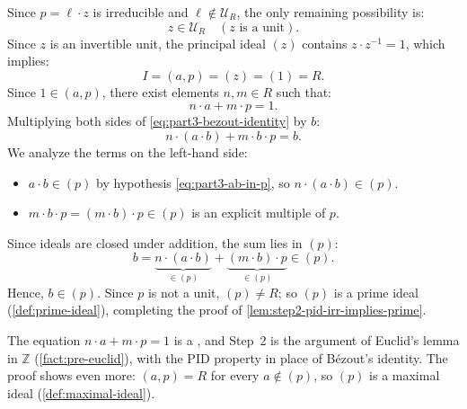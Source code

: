 \begin{proofWrapper}
\begin{content}
Since $p = \ell \cdot z$ is irreducible and $\ell \notin \mathcal{U}_R$, the only remaining possibility is:
\begin{equation}\label{eq:part3-z-is-unit}
z \in \mathcal{U}_R \quad (z \text{ is a unit}).
\end{equation}
Since $z$ is an invertible unit, the principal ideal $(z)$ contains $z \cdot z^{-1} = 1$, which implies:
\begin{equation}\label{eq:part3-ideal-unit}
I = (a, p) = (z) = (1) = R.
\end{equation}
Since $1 \in (a, p)$, there exist elements $n, m \in R$ such that:
\begin{equation}\label{eq:part3-bezout-identity}
n \cdot a + m \cdot p = 1.
\end{equation}
Multiplying both sides of \eqref{eq:part3-bezout-identity} by $b$:
\begin{equation}\label{eq:part3-multiply-b}
n \cdot (a \cdot b) + m \cdot b \cdot p = b.
\end{equation}
We analyze the terms on the left-hand side:
\begin{itemize}
    \item $a \cdot b \in (p)$ by hypothesis \eqref{eq:part3-ab-in-p}, so $n \cdot (a \cdot b) \in (p)$.
    \item $m \cdot b \cdot p = (m \cdot b) \cdot p \in (p)$ is an explicit multiple of $p$.
\end{itemize}
Since ideals are closed under addition, the sum lies in $(p)$:
\begin{equation}\label{eq:part3-b-in-p-final}
b = \underbrace{n \cdot (a \cdot b)}_{\in (p)} + \underbrace{(m \cdot b) \cdot p}_{\in (p)} \in (p).
\end{equation}
Hence, $b \in (p)$. Since $p$ is not a unit, $(p) \neq R$; so $(p)$ is a prime ideal (\cref{def:prime-ideal}), completing the proof of \cref{lem:step2-pid-irr-implies-prime}.
\end{content}
\end{proofWrapper}

\begin{aiNote}
The equation $n \cdot a + m \cdot p = 1$ is a , and Step~2 is the argument of Euclid's lemma in $\mathbb{Z}$ (\cref{fact:pre-euclid}), with the PID property in place of Bézout's identity. The proof shows even more: $(a, p) = R$ for every $a \notin (p)$, so $(p)$ is a maximal ideal (\cref{def:maximal-ideal}).
\end{aiNote}

